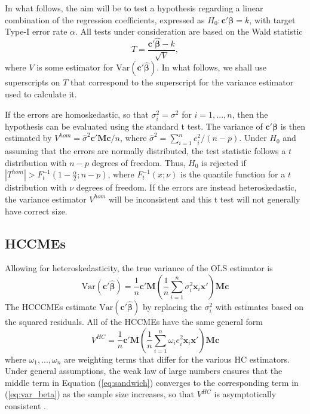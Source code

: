 \documentclass[12pt]{article}\usepackage[]{graphicx}\usepackage[]{color}
\newcommand{\Var}{\text{Var}}
\newcommand{\bm}{\mathbf}
\newcommand{\bs}{\boldsymbol}
\begin{document}
In what follows, the aim will be to test a hypothesis regarding a linear combination of the regression coefficients, expressed as $H_0: \bm{c}'\bs\beta = k$, with target Type-I error rate $\alpha$. 
All tests under consideration are based on the Wald statistic
\begin{equation}
T = \frac{\bm{c}'\bs{\hat\beta} - k}{\sqrt{V}},
\end{equation}
where $V$ is some estimator for $\Var\left(\bm{c}'\bs{\hat\beta}\right)$. In what follows, we shall use superscripts on $T$ that correspond to the superscript for the variance estimator used to calculate it.

If the errors are homoskedastic, so that $\sigma_i^2 = \sigma^2$ for $i = 1,...,n$, then the hypothesis can be evaluated using the standard t test. 
The variance of $\bm{c}'\bs\beta$ is then estimated by $V^{hom} = \hat\sigma^2 \bm{c}'\bm{M}\bm{c} / n$, where $\hat\sigma^2 = \sum_{i=1}^n e_i^2 / (n - p)$. 
Under $H_0$ and assuming that the errors are normally distributed, the test statistic follows a $t$ distribution with $n - p$ degrees of freedom. 
Thus, $H_0$ is rejected if $\left|T^{hom}\right| > F_t^{-1}\left(1 - \frac{\alpha}{2}; n - p\right)$, where $F_t^{-1}(x; \nu)$ is the quantile function for a $t$ distribution with $\nu$ degrees of freedom. 
If the errors are instead heteroskedastic, the variance estimator $V^{hom}$ will be inconsistent and this t test will not generally have correct size. 

\subsection{HCCMEs}

Allowing for heteroskedasticity, the true variance of the OLS estimator is 
\begin{equation}
\label{eq:var_beta}
\Var\left(\bm{c}'\bs{\hat\beta}\right) = \frac{1}{n} \bm{c}'\bm{M} \left(\frac{1}{n}\sum_{i=1}^n \sigma_i^2 \bm{x}_i\bm{x}'\right) \bm{M}\bm{c}
\end{equation}
The HCCCMEs estimate $\Var\left(\bm{c}'\bs{\hat\beta}\right)$ by replacing the $\sigma_i^2$ with estimates based on the squared residuals. All of the HCCMEs have the same general form  
\begin{equation}
\label{eq:sandwich}
V^{HC} = \frac{1}{n} \bm{c}'\bm{M} \left(\frac{1}{n}\sum_{i=1}^n \omega_i e_i^2 \bm{x}_i\bm{x}'\right)\bm{M} \bm{c}
\end{equation}
where $\omega_{1},...,\omega_{n}$ are weighting terms that differ for the various HC estimators. 
Under general assumptions, the weak law of large numbers ensures that the middle term in Equation (\ref{eq:sandwich}) converges to the corresponding term in (\ref{eq:var_beta}) as the sample size increases, so that $V^{HC}$ is asymptotically consistent \citep{White1980heteroskedasticity}.
\end{document}
